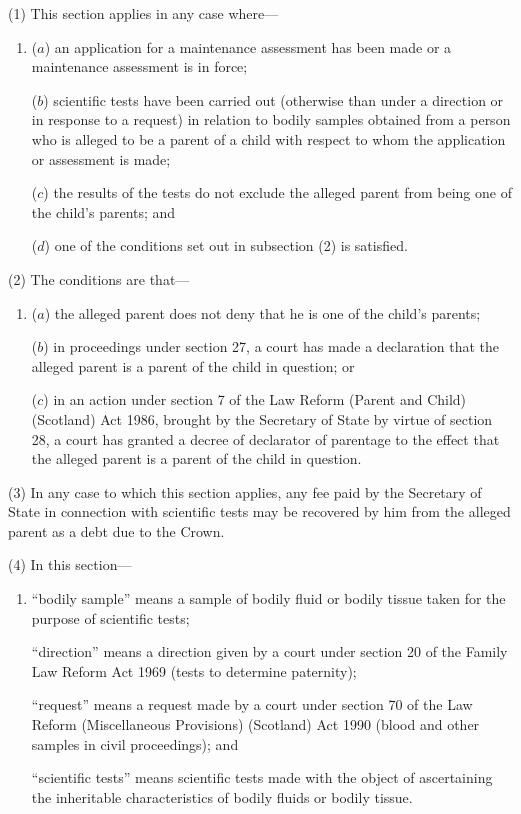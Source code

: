 \documentclass[12pt,a4paper]{article}
\begin{document}
(1) This section applies in any case where—
\begin{enumerate}\item[]
($a$) an application for a maintenance assessment has been made or a maintenance assessment is in force;

($b$) scientific tests have been carried out (otherwise than under a direction or in response to a request) in relation to bodily samples obtained from a person who is alleged to be a parent of a child with respect to whom the application or assessment is made;

($c$) the results of the tests do not exclude the alleged parent from being one of the child’s parents; and

($d$) one of the conditions set out in subsection (2) is satisfied.
\end{enumerate}

(2) The conditions are that—
\begin{enumerate}\item[]
($a$) the alleged parent does not deny that he is one of the child’s parents;

($b$) in proceedings under section 27, a court has made a declaration that the alleged parent is a parent of the child in question; or

($c$) in an action under section 7 of the Law Reform (Parent and Child) (Scotland) Act 1986, brought by the Secretary of State by virtue of section 28, a court has granted a decree of declarator of parentage to the effect that the alleged parent is a parent of the child in question.
\end{enumerate}

(3) In any case to which this section applies, any fee paid by the Secretary of State in connection with scientific tests may be recovered by him from the alleged parent as a debt due to the Crown.

(4) In this section—
\begin{enumerate}\item[]
“bodily sample” means a sample of bodily fluid or bodily tissue taken for the purpose of scientific tests;

“direction” means a direction given by a court under section 20 of the Family Law Reform Act 1969 (tests to determine paternity);

“request” means a request made by a court under section 70 of the Law Reform (Miscellaneous Provisions) (Scotland) Act 1990 (blood and other samples in civil proceedings); and

“scientific tests” means scientific tests made with the object of ascertaining the inheritable characteristics of bodily fluids or bodily tissue.
\end{enumerate}
\end{document}

